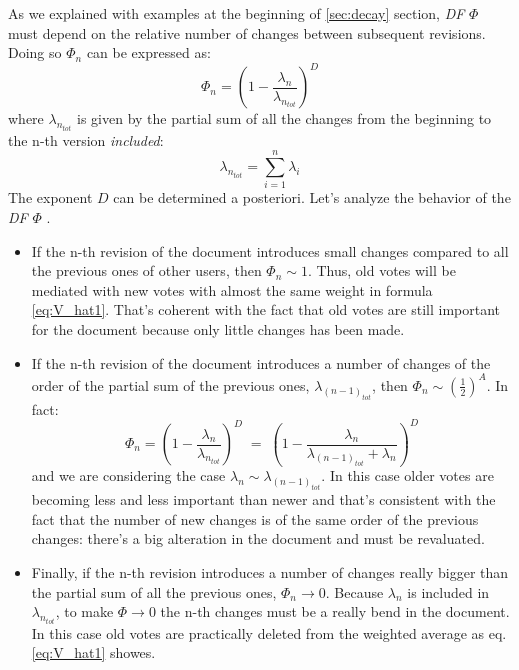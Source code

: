 \documentclass[a4paper,11pt]{article}
\newcommand{\DPii}{\emph{DF} $\Phi$ }
\begin{document}
As we explained with examples at the beginning of \ref{sec:decay} section, \DPii must 
depend on the relative number of changes between subsequent revisions.
\\ Doing so $\Phi_n$ can be expressed as:
\begin{equation} \label{eq:phi}
\Phi_n = \left(1- \frac{\lambda_n}{\lambda_{n_{tot}}}\right)^D
\end{equation}
where $\lambda_{n_{tot}}$ is given by the partial sum of all the changes from the 
beginning to the n-th version \emph{included}:
\begin{equation}
\lambda_{n_{tot}} = \sum_{i=1}^n \lambda_i
\end{equation}
The exponent $D$ can be determined a posteriori. 
Let's analyze the behavior of the \DPii.\\
\begin{itemize}
\item If the n-th revision of the document introduces small changes compared to all the 
previous ones of other users, then $\Phi_n \sim1$. Thus, old votes will be mediated 
with new votes with almost the same weight in formula \ref{eq:V_hat1}. That's coherent 
with the fact that old votes are still important for the document because only little 
changes has been made.
\item If the n-th revision of the document introduces a number of changes of the order of 
the partial sum of the previous ones, $\lambda_{\left(n-1\right)_{tot}}$, then $\Phi_n \sim \left(\frac{1}
{2}\right)^A$. In fact:
\begin{equation}
\Phi_n =  \left(1- \frac{\lambda_n}{\lambda_{n_{tot}}}\right)^D \; = \; \left(1- \frac{\lambda_n}{\lambda_{\left(n-1\right)_{tot}} + \lambda_n}\right)^D
\end{equation}
and we are considering the case $\lambda_n \sim \lambda_{\left(n-1\right)_{tot}}$.
In this case older votes are becoming less and less important than newer and that's 
consistent with the fact that the number of new changes is of the same order of the 
previous changes: there's a big alteration in the document and must be revaluated.
\item Finally, if the n-th revision introduces a number of changes really bigger than the 
partial sum of all the previous ones, $\Phi_n \rightarrow 0$. Because $\lambda_n$ is 
included in $\lambda_{n_{tot}}$, to make $\Phi \rightarrow 0$ the n-th changes must be a 
really bend in the document. In this case old votes are practically deleted from the 
weighted average as eq. \ref{eq:V_hat1} showes.
\end{itemize}
\end{document}
